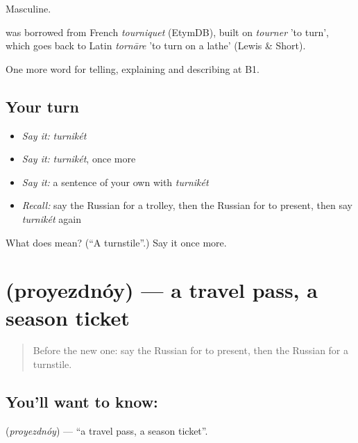 Masculine.

\begin{cousinweb}
\emph{} was borrowed from French \emph{tourniquet} (EtymDB), built on \emph{tourner} 'to turn', which goes back to Latin \emph{tornāre} 'to turn on a lathe' (Lewis \& Short).
\end{cousinweb}

\begin{grammarlens}[title={What you've built}]
One more word for telling, explaining and describing at B1.
\end{grammarlens}

\subsection*{Your turn}
\begin{itemize}
\raggedright
  \item \emph{Say it:} \emph{turnikét}
  \item \emph{Say it:} \emph{turnikét}, once more
  \item \emph{Say it:} a sentence of your own with \emph{turnikét}
  \item \emph{Recall:} say the Russian for a trolley, then the Russian for to present, then say \emph{turnikét} again
\end{itemize}

\begin{tcolorbox}[breakable,colback=teal!4,colframe=teal!35!black,title={Before you move on}]
What does  mean? (\textquotedblleft{}A turnstile\textquotedblright{}.) Say it once more.
\end{tcolorbox}
\section[\texorpdfstring{\ru{проездной} (proyezdnóy)}{проездной (proyezdnóy)}]{ (proyezdnóy) — a travel pass, a season ticket}

\label{lesson:RU-C417-proyezdnoy}



\begin{quote}
Before the new one: say the Russian for to present, then the Russian for a turnstile.
\end{quote}

\subsection*{You'll want to know: }
\textbf{} (\emph{proyezdnóy}) — \textquotedblleft{}a travel pass, a season ticket\textquotedblright{}.

